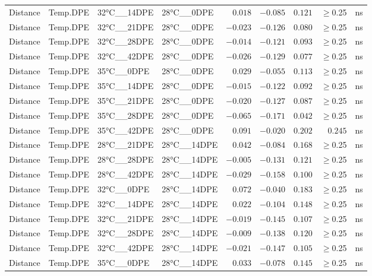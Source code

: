 \documentclass[
]{article}
\begin{document}
\begin{longtable}{llllrrrrl}
Distance & Temp.DPE & 32°C\_\_14DPE & 28°C\_\_0DPE & $0.018$ & $-0.085$ & $0.121$ & $\geq$0.25 & ns \\ 
Distance & Temp.DPE & 32°C\_\_21DPE & 28°C\_\_0DPE & $-0.023$ & $-0.126$ & $0.080$ & $\geq$0.25 & ns \\ 
Distance & Temp.DPE & 32°C\_\_28DPE & 28°C\_\_0DPE & $-0.014$ & $-0.121$ & $0.093$ & $\geq$0.25 & ns \\ 
Distance & Temp.DPE & 32°C\_\_42DPE & 28°C\_\_0DPE & $-0.026$ & $-0.129$ & $0.077$ & $\geq$0.25 & ns \\ 
Distance & Temp.DPE & 35°C\_\_0DPE & 28°C\_\_0DPE & $0.029$ & $-0.055$ & $0.113$ & $\geq$0.25 & ns \\ 
Distance & Temp.DPE & 35°C\_\_14DPE & 28°C\_\_0DPE & $-0.015$ & $-0.122$ & $0.092$ & $\geq$0.25 & ns \\ 
Distance & Temp.DPE & 35°C\_\_21DPE & 28°C\_\_0DPE & $-0.020$ & $-0.127$ & $0.087$ & $\geq$0.25 & ns \\ 
Distance & Temp.DPE & 35°C\_\_28DPE & 28°C\_\_0DPE & $-0.065$ & $-0.171$ & $0.042$ & $\geq$0.25 & ns \\ 
Distance & Temp.DPE & 35°C\_\_42DPE & 28°C\_\_0DPE & $0.091$ & $-0.020$ & $0.202$ & $0.245$ & ns \\ 
Distance & Temp.DPE & 28°C\_\_21DPE & 28°C\_\_14DPE & $0.042$ & $-0.084$ & $0.168$ & $\geq$0.25 & ns \\ 
Distance & Temp.DPE & 28°C\_\_28DPE & 28°C\_\_14DPE & $-0.005$ & $-0.131$ & $0.121$ & $\geq$0.25 & ns \\ 
Distance & Temp.DPE & 28°C\_\_42DPE & 28°C\_\_14DPE & $-0.029$ & $-0.158$ & $0.100$ & $\geq$0.25 & ns \\ 
Distance & Temp.DPE & 32°C\_\_0DPE & 28°C\_\_14DPE & $0.072$ & $-0.040$ & $0.183$ & $\geq$0.25 & ns \\ 
Distance & Temp.DPE & 32°C\_\_14DPE & 28°C\_\_14DPE & $0.022$ & $-0.104$ & $0.148$ & $\geq$0.25 & ns \\ 
Distance & Temp.DPE & 32°C\_\_21DPE & 28°C\_\_14DPE & $-0.019$ & $-0.145$ & $0.107$ & $\geq$0.25 & ns \\ 
Distance & Temp.DPE & 32°C\_\_28DPE & 28°C\_\_14DPE & $-0.009$ & $-0.138$ & $0.120$ & $\geq$0.25 & ns \\ 
Distance & Temp.DPE & 32°C\_\_42DPE & 28°C\_\_14DPE & $-0.021$ & $-0.147$ & $0.105$ & $\geq$0.25 & ns \\ 
Distance & Temp.DPE & 35°C\_\_0DPE & 28°C\_\_14DPE & $0.033$ & $-0.078$ & $0.145$ & $\geq$0.25 & ns \\ 

\end{longtable}
\end{document}

